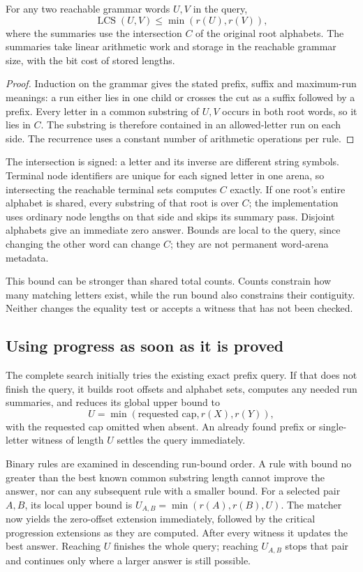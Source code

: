 \begin{proposition}
For any two reachable grammar words $U,V$ in the query,
\[
 \operatorname{LCS}(U,V)\le\min(r(U),r(V)),
\]
where the summaries use the intersection $C$ of the original root alphabets.
The summaries take linear arithmetic work and storage in the reachable
grammar size, with the bit cost of stored lengths.
\end{proposition}
\begin{proof}
Induction on the grammar gives the stated prefix, suffix and maximum-run
meanings: a run either lies in one child or crosses the cut as a suffix
followed by a prefix. Every letter in a common substring of $U,V$ occurs
in both root words, so it lies in $C$. The substring is therefore contained
in an allowed-letter run on each side. The recurrence uses a constant
number of arithmetic operations per rule.
\end{proof}

The intersection is signed: a letter and its inverse are different string
symbols. Terminal node identifiers are unique for each signed letter in
one arena, so intersecting the reachable terminal sets computes $C$
exactly. If one root's entire alphabet is shared, every substring of that
root is over $C$; the implementation uses ordinary node lengths on that
side and skips its summary pass. Disjoint alphabets give an immediate
zero answer. Bounds are local to the query, since changing the other
word can change $C$; they are not permanent word-arena metadata.

This bound can be stronger than shared total counts. Counts constrain how
many matching letters exist, while the run bound also constrains their
contiguity. Neither changes the equality test or accepts a witness that
has not been checked.

\subsection{Using progress as soon as it is proved}

The complete search initially tries the existing exact prefix query. If
that does not finish the query, it builds root offsets and alphabet sets,
computes any needed run summaries, and reduces its global upper bound to
\[
 U=\min(\text{requested cap},r(X),r(Y)),
\]
with the requested cap omitted when absent. An already found prefix or
single-letter witness of length $U$ settles the query immediately.

Binary rules are examined in descending run-bound order. A rule with
bound no greater than the best known common substring length cannot
improve the answer, nor can any subsequent rule with a smaller bound.
For a selected pair $A,B$, its local upper bound is
$U_{A,B}=\min(r(A),r(B),U)$. The matcher now yields the zero-offset
extension immediately, followed by the critical progression extensions
as they are computed. After every witness it updates the best answer.
Reaching $U$ finishes the whole query; reaching $U_{A,B}$ stops that pair
and continues only where a larger answer is still possible.

